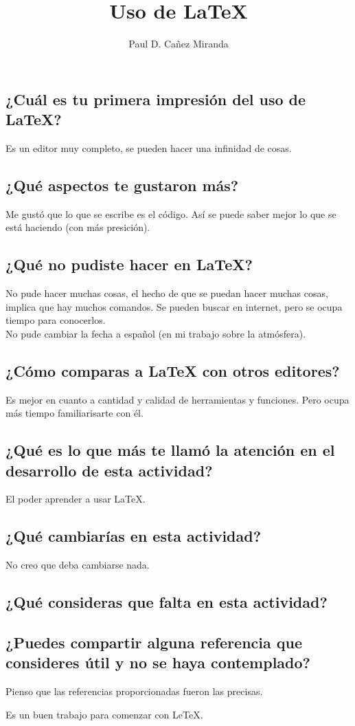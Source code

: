 \documentclass[a4paper]{article}
\title{Uso de LaTeX}
\author{Paul D. Cañez Miranda}
\begin{document}
\maketitle


\subsection*{¿Cuál es tu primera impresión del uso de LaTeX?}
Es un editor muy completo, se pueden hacer una infinidad de cosas. 


\subsection*{¿Qué aspectos te gustaron más?}
Me gustó que lo que se escribe es el código. Así se puede saber mejor lo que se está haciendo (con más presición).

\subsection*{¿Qué no pudiste hacer en LaTeX?}
No pude hacer muchas cosas, el hecho de que se puedan hacer muchas cosas, implica que hay muchos comandos. Se pueden buscar en internet, pero se ocupa tiempo para conocerlos. \\ No pude cambiar la fecha a español (en mi trabajo sobre la atmósfera).

\subsection*{¿Cómo comparas a LaTeX con otros editores?}
Es mejor en cuanto a cantidad y calidad de herramientas y funciones. Pero ocupa más tiempo familiarisarte con él. 

\subsection*{¿Qué es lo que más te llamó la atención en el desarrollo de esta actividad?}
El poder aprender a usar LaTeX. 

\subsection*{¿Qué cambiarías en esta actividad?}
No creo que deba cambiarse nada. 
\subsection*{¿Qué consideras que falta en esta actividad?}

\subsection*{¿Puedes compartir alguna referencia que consideres útil y no se haya contemplado?}
Pienso que las referencias proporcionadas fueron las precisas.



Es un buen trabajo para comenzar con LeTeX.
\end{document}

